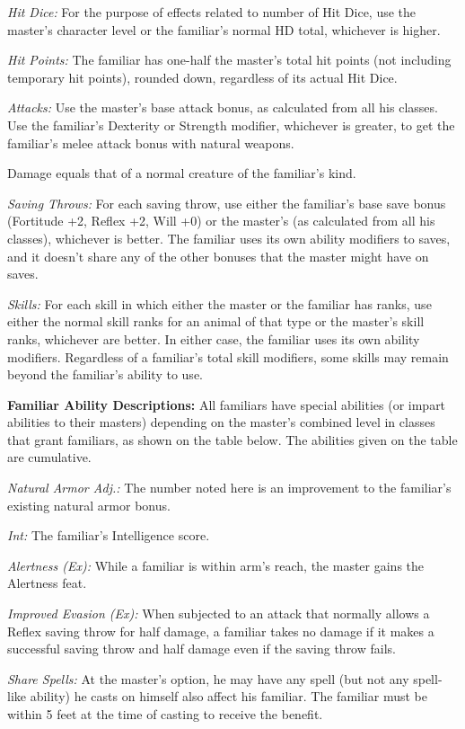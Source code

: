 \documentclass{article}
\begin{document}
\textit{Hit Dice: }For the purpose of effects related to number of Hit Dice, use 
the master's character level or the familiar's normal HD total, whichever is higher.

\textit{Hit Points: }The familiar has one-half the master's total hit points (not 
including temporary hit points), rounded down, regardless of its actual Hit Dice.

\textit{Attacks: }Use the master's base attack bonus, as calculated from all his 
classes. Use the familiar's Dexterity or Strength modifier, whichever is greater, 
to get the familiar's melee attack bonus with natural weapons.

Damage equals that of a normal creature of the familiar's kind.

\textit{Saving Throws: }For each saving throw, use either the familiar's base save 
bonus (Fortitude +2, Reflex +2, Will +0) or the master's (as calculated from all 
his classes), whichever is better. The familiar uses its own ability modifiers 
to saves, and it doesn't share any of the other bonuses that the master might have 
on saves.

\textit{Skills: }For each skill in which either the master or the familiar has 
ranks, use either the normal skill ranks for an animal of that type or the master's 
skill ranks, whichever are better. In either case, the familiar uses its own ability 
modifiers. Regardless of a familiar's total skill modifiers, some skills may remain 
beyond the familiar's ability to use.

\textbf{Familiar Ability Descriptions: }All familiars have special abilities (or 
impart abilities to their masters) depending on the master's combined level in 
classes that grant familiars, as shown on the table below. The abilities given 
on the table are cumulative. 

\textit{Natural Armor Adj.: }The number noted here is an improvement to the familiar's 
existing natural armor bonus.

\textit{Int: }The familiar's Intelligence score.

\textit{Alertness (Ex): }While a familiar is within arm's reach, the master gains 
the Alertness feat.

\textit{Improved Evasion (Ex): }When subjected to an attack that normally allows 
a Reflex saving throw for half damage, a familiar takes no damage if it makes a 
successful saving throw and half damage even if the saving throw fails.

\textit{Share Spells: }At the master's option, he may have any spell (but not any 
spell-like ability) he casts on himself also affect his familiar. The familiar 
must be within 5 feet at the time of casting to receive the benefit.
\end{document}
